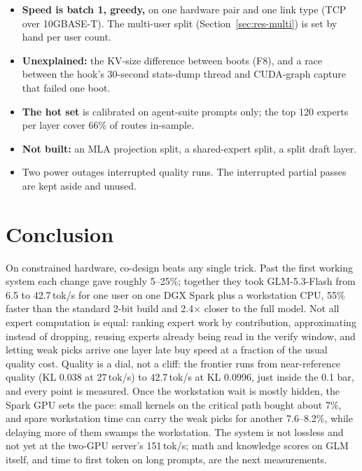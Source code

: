 \documentclass[11pt]{article}
\newcommand{\tps}{\,tok/s}
\begin{document}
\begin{itemize}
    top-5 + union + stand-in vs 89/100 for all 8 experts; 90/100 at top-3 + 2 late) and GSM8K/MMLU-Pro for union routing
    on Qwen3.6-35B; no math or knowledge benchmark on GLM yet. The agent-suite scores of the early audit are for
    config B.
  \item \textbf{Speed is batch 1, greedy,} on one hardware pair and one link type (TCP over 10GBASE-T). The multi-user
    split (Section~\ref{sec:res-multi}) is set by hand per user count.
  \item \textbf{Unexplained:} the KV-size difference between boots (F8), and a race between the hook's 30-second
    stats-dump thread and CUDA-graph capture that failed one boot.
  \item \textbf{The hot set} is calibrated on agent-suite prompts only; the top 120 experts per layer cover 66\% of
    routes in-sample.
  \item \textbf{Not built:} an MLA projection split, a shared-expert split, a split draft layer.
  \item Two power outages interrupted quality runs. The interrupted partial passes are kept aside and unused.
\end{itemize}

\section{Conclusion}
\label{sec:conclusion}
On constrained hardware, co-design beats any single trick. Past the first working system each change gave roughly
5--25\%; together they took GLM-5.3-Flash from 6.5 to 42.7\tps{} for one user on one DGX Spark plus a workstation CPU,
55\% faster than the standard 2-bit build and 2.4$\times$ closer to the full model. Not all expert computation is equal:
ranking expert work by contribution, approximating instead of dropping, reusing experts already being read in the
verify window, and letting weak picks arrive one layer late buy speed at a fraction of the usual quality cost. Quality is
a dial, not a cliff: the frontier runs from near-reference quality (KL 0.038 at 27\tps) to 42.7\tps{} at KL 0.0996,
just inside the 0.1 bar, and every point is measured. Once the workstation wait is mostly hidden, the Spark GPU sets the
pace: small kernels on the critical path bought about 7\%, and spare workstation time can carry the weak picks for
another 7.6--8.2\%, while delaying more of them swamps the workstation. The system is not lossless and not yet at the
two-GPU server's 151\tps; math and knowledge scores on GLM itself, and time to first token on long prompts, are the
next measurements.
\end{document}
